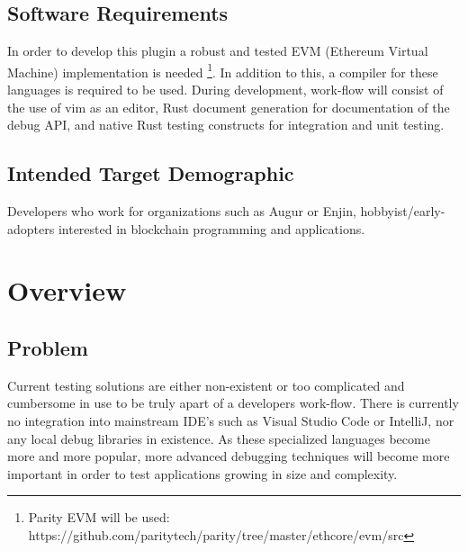 \documentclass[]{article}
\begin{document}
\subsection{Software Requirements}
\iffalse
====================================== COMMENT/JACKOWITZ ======================================================
Are you or are you not proposing to develop such a plugin? It is unclear from what you have said here. 
====================================== COMMENT/JACKOWITZ ======================================================
\fi
In order to develop this plugin a robust and tested EVM (Ethereum Virtual Machine) implementation is needed \footnote{Parity EVM will be used: https://github.com/paritytech/parity/tree/master/ethcore/evm/src}. In addition to this, a compiler for these languages is required to be used. During development, work-flow will consist of the use of vim as an editor, Rust document generation for documentation of the debug API, and native Rust testing constructs for integration and unit testing.

\subsection{Intended Target Demographic}
Developers who work for organizations such as Augur or Enjin, hobbyist/early-adopters interested in blockchain programming and applications.

\bigskip
\section{Overview}

\subsection{Problem}
Current testing solutions are either non-existent or too complicated and cumbersome in use to be truly apart of a developers work-flow. There is currently no integration into mainstream IDE's such as Visual Studio Code or IntelliJ, nor any local debug libraries in existence. As these specialized languages become more and more popular, more advanced debugging techniques will become more important in order to test applications growing in size and complexity. 
\end{document}

